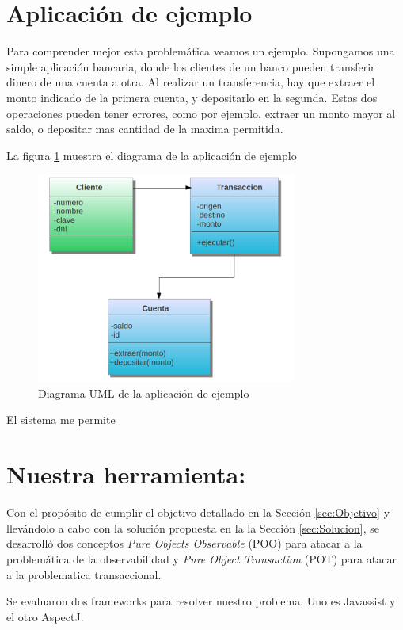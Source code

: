 \section{Aplicación de ejemplo}

Para comprender mejor esta problemática veamos un ejemplo. Supongamos una simple
aplicación bancaria, donde los clientes de un banco pueden transferir dinero de
una cuenta a otra. Al realizar un transferencia, hay que extraer el monto
indicado de la primera cuenta, y depositarlo en la segunda. Estas dos
operaciones pueden tener errores, como por ejemplo, extraer un monto mayor al
saldo, o depositar mas cantidad de la maxima permitida.

La  figura \ref{example} muestra el diagrama de la aplicación de
ejemplo

	\begin{figure}[h]
		\includegraphics{img/objectTransaction}
		\caption{Diagrama UML de la aplicación de ejemplo}
		\label{example}
	\end{figure}	


El sistema me permite 

\section{Nuestra herramienta: }

Con el propósito de cumplir el objetivo detallado en la Sección
\ref{sec:Objetivo} y llevándolo a cabo con la solución propuesta en la  la
Sección \ref{sec:Solucion}, se desarrolló dos conceptos \emph{Pure Objects
Observable} (POO)  para atacar a la problemática de la observabilidad y
\emph{Pure Object Transaction} (POT) para atacar a la problematica
transaccional.

\medskip  

Se evaluaron dos frameworks para resolver nuestro problema. Uno es Javassist y
el otro AspectJ. \cite{KiczalesHHKPG01}

